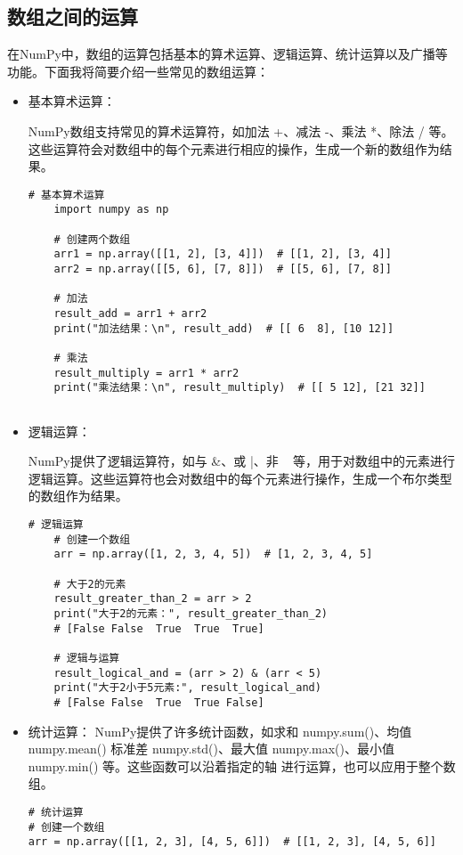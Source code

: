 \documentclass{article}
\begin{document}
\subsection{数组之间的运算}
在NumPy中，数组的运算包括基本的算术运算、逻辑运算、统计运算以及广播等功能。下面我将简要介绍一些常见的数组运算：
\begin{itemize}
    

    \item 基本算术运算：

NumPy数组支持常见的算术运算符，如加法 +、减法 -、乘法 *、除法 / 等。这些运算符会对数组中的每个元素进行相应的操作，生成一个新的数组作为结果。

    
\begin{lstlisting}[caption={示例Python代码}]
    # 基本算术运算
    import numpy as np
    
    # 创建两个数组
    arr1 = np.array([[1, 2], [3, 4]])  # [[1, 2], [3, 4]]
    arr2 = np.array([[5, 6], [7, 8]])  # [[5, 6], [7, 8]]
    
    # 加法
    result_add = arr1 + arr2
    print("加法结果：\n", result_add)  # [[ 6  8], [10 12]]
    
    # 乘法
    result_multiply = arr1 * arr2
    print("乘法结果：\n", result_multiply)  # [[ 5 12], [21 32]]
    

\end{lstlisting}

\item 逻辑运算：

 NumPy提供了逻辑运算符，如与 \&、或 |、非 ~ 等，用于对数组中的元素进行逻辑运算。这些运算符也会对数组中的每个元素进行操作，生成一个布尔类型的数组作为结果。

 \begin{lstlisting}[caption={示例Python代码}]
    # 逻辑运算
    # 创建一个数组
    arr = np.array([1, 2, 3, 4, 5])  # [1, 2, 3, 4, 5]
    
    # 大于2的元素
    result_greater_than_2 = arr > 2
    print("大于2的元素：", result_greater_than_2) 
    # [False False  True  True  True]
    
    # 逻辑与运算
    result_logical_and = (arr > 2) & (arr < 5)
    print("大于2小于5元素:", result_logical_and) 
    # [False False  True  True False]
    \end{lstlisting}


 \item 统计运算： 
NumPy提供了许多统计函数，如求和 numpy.sum()、均值 numpy.mean()
标准差 numpy.std()、最大值 
numpy.max()、最小值 numpy.min() 等。这些函数可以沿着指定的轴
进行运算，也可以应用于整个数组。
\begin{lstlisting}[caption={示例Python代码}]
 # 统计运算
# 创建一个数组
arr = np.array([[1, 2, 3], [4, 5, 6]])  # [[1, 2, 3], [4, 5, 6]]


\end{lstlisting}
\end{itemize}
\end{document}
